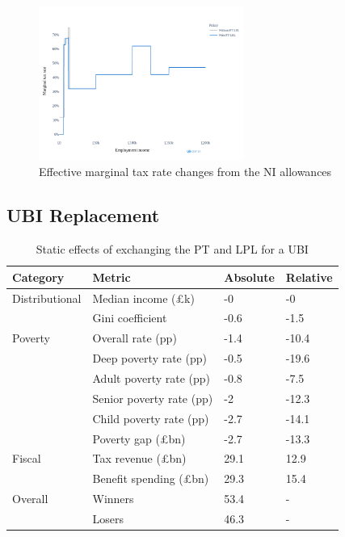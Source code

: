 \documentclass{article}
\begin{document}
    \begin{figure}
        \centering
        \includegraphics[width=0.6\textwidth]{images/fig_9.png}
        \caption{Effective marginal tax rate changes from the NI allowances}
        \label{fig:NI_mtr_effects}
    \end{figure}

    \subsection{UBI Replacement}

    \begin{table}
        \centering
        \begin{tabular}{llll}
            \toprule
            Category & Metric & Absolute & Relative \\
            \midrule
            Distributional & Median income (£k) &       -0 &       -0 \\
                    & Gini coefficient &     -0.6 &     -1.5 \\
            Poverty & Overall rate (pp) &     -1.4 &    -10.4 \\
                    & Deep poverty rate (pp) &     -0.5 &    -19.6 \\
                    & Adult poverty rate (pp) &     -0.8 &     -7.5 \\
                    & Senior poverty rate (pp) &       -2 &    -12.3 \\
                    & Child poverty rate (pp) &     -2.7 &    -14.1 \\
                    & Poverty gap (£bn) &     -2.7 &    -13.3 \\
            Fiscal & Tax revenue (£bn) &     29.1 &     12.9 \\
                    & Benefit spending (£bn) &     29.3 &     15.4 \\
            Overall & Winners &     53.4 &        - \\
                    & Losers &     46.3 &        - \\
            \bottomrule
        \end{tabular}
        \caption{Static effects of exchanging the PT and LPL for a UBI}
        \label{tab:NI_UBI_effects}
    \end{table}
\end{document}
